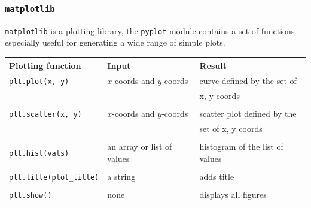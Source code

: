 \documentclass[12pt,t]{beamer}
\begin{document}
\begin{frame}
  \frametitle{\texttt{matplotlib}}
  \vskip-0.4cm
  \texttt{matplotlib} is a plotting library, the \texttt{pyplot} module contains a set of functions especially useful for generating a wide range of simple plots. 
 \vskip0.3cm
  \scriptsize{
  \begin{tabular}{lll}
  \normalsize{\textbf{Plotting function}} &\normalsize{ \textbf{Input}} & \normalsize{\textbf{Result}}\\
  \hline
 \texttt{plt.plot(x, y)} & $x$-coords and $y$-coords & curve defined by the set of \\
  && x, y coords \\
  &&\\
    \texttt{plt.scatter(x, y)} & $x$-coords and $y$-coords & scatter plot defined by the\\
    &&  set of x, y coords\\
    &&\\
    \texttt{plt.hist(vals)} & an array or list of values & histogram of the list of values\\
    &&\\
    \texttt{plt.title(plot\_title)} & a string & adds title\\
    &&\\
    \texttt{plt.show()} & none & displays all figures \\
  \end{tabular}}
  
\end{frame}
\end{document}
